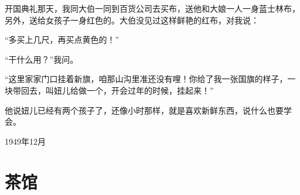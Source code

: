 \documentclass[12pt,UTF-8,openany]{ctexbook}
\begin{document}
\begin{large}
    开国典礼那天，我同大伯一同到百货公司去买布，送他和大娘一人一身蓝士林布，另外，送给女孩子一身红色的。大伯没见过这样鲜艳的红布，对我说：
    
    “多买上几尺，再买点黄色的！”
    
    “干什么用？”我问。
    
    “这里家家门口挂着新旗，咱那山沟里准还没有哩！你给了我一张国旗的样子，一块带回去，叫妞儿给做一个，开会过年的时候，挂起来！”
    
    他说妞儿已经有两个孩子了，还像小时那样，就是喜欢新鲜东西，说什么也要学会。
    
    \hfill 1949年12月
    
\end{large}



\chapter{茶馆}
\end{document}
